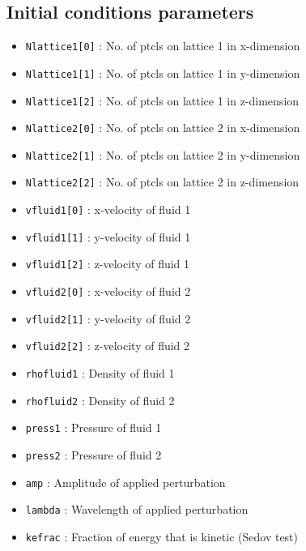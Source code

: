 \documentclass[a4paper]{article}
\newcommand{\var}[1]{\texttt{#1}}
\begin{document}
\subsection{Initial conditions parameters}

\begin{itemize}

\item \var{Nlattice1[0]} : No. of ptcls on lattice 1 in x-dimension
\item \var{Nlattice1[1]} : No. of ptcls on lattice 1 in y-dimension
\item \var{Nlattice1[2]} : No. of ptcls on lattice 1 in z-dimension
\item \var{Nlattice2[0]} : No. of ptcls on lattice 2 in x-dimension
\item \var{Nlattice2[1]} : No. of ptcls on lattice 2 in y-dimension
\item \var{Nlattice2[2]} : No. of ptcls on lattice 2 in z-dimension

\item \var{vfluid1[0]}   : x-velocity of fluid 1
\item \var{vfluid1[1]}   : y-velocity of fluid 1
\item \var{vfluid1[2]}   : z-velocity of fluid 1
\item \var{vfluid2[0]}   : x-velocity of fluid 2
\item \var{vfluid2[1]}   : y-velocity of fluid 2
\item \var{vfluid2[2]}   : z-velocity of fluid 2

\item \var{rhofluid1}    : Density of fluid 1
\item \var{rhofluid2}    : Density of fluid 2

\item \var{press1}       : Pressure of fluid 1
\item \var{press2}       : Pressure of fluid 2

\item \var{amp}          : Amplitude of applied perturbation
\item \var{lambda}       : Wavelength of applied perturbation

\item \var{kefrac}       : Fraction of energy that is kinetic (Sedov test)



\end{itemize}
\end{document}
